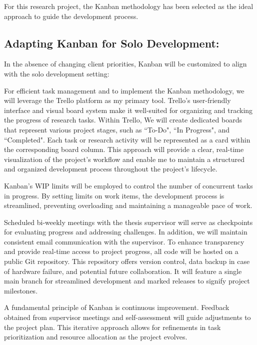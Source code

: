 For this research project, the Kanban methodology has been selected as the ideal approach to guide the development process. 

\subsection{Adapting Kanban for Solo Development:}

In the absence of changing client priorities, Kanban will be customized to align with the solo development setting:


For efficient task management and to implement the Kanban methodology, we will leverage the Trello platform as my primary tool. Trello's user-friendly interface and visual board system make it well-suited for organizing and tracking the progress of research tasks. Within Trello, We will create dedicated boards that represent various project stages, such as ``To-Do", ``In Progress", and ``Completed". Each task or research activity will be represented as a card within the corresponding board column. This approach will provide a clear, real-time visualization of the project's workflow and enable me to maintain a structured and organized development process throughout the project's lifecycle.


Kanban's WIP limits will be employed to control the number of concurrent tasks in progress. By setting limits on work items, the development process is streamlined, preventing overloading and maintaining a manageable pace of work.


Scheduled bi-weekly meetings with the thesis supervisor will serve as checkpoints for evaluating progress and addressing challenges. In addition, we will maintain consistent email communication with the supervisor. To enhance transparency and provide real-time access to project progress, all code will be hosted on a public Git repository. This repository offers version control, data backup in case of hardware failure, and potential future collaboration. It will feature a single main branch for streamlined development and marked releases to signify project milestones.

 A fundamental principle of Kanban is continuous improvement. Feedback obtained from supervisor meetings and self-assessment will guide adjustments to the project plan. This iterative approach allows for refinements in task prioritization and resource allocation as the project evolves.

